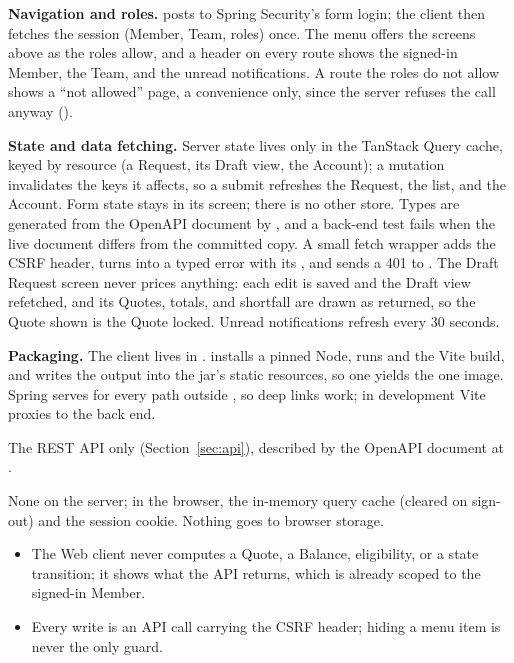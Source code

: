 \textbf{Navigation and roles.}  posts to Spring Security's form login; the client then fetches the session (Member, Team, roles) once. The menu offers the screens above as the roles allow, and a header on every route shows the signed-in Member, the Team, and the unread notifications. A route the roles do not allow shows a ``not allowed'' page, a convenience only, since the server refuses the call anyway ().

\textbf{State and data fetching.} Server state lives only in the TanStack Query cache, keyed by resource (a Request, its Draft view, the Account); a mutation invalidates the keys it affects, so a submit refreshes the Request, the list, and the Account. Form state stays in its screen; there is no other store. Types are generated from the OpenAPI document by , and a back-end test fails when the live document differs from the committed copy. A small fetch wrapper adds the CSRF header, turns  into a typed error with its , and sends a 401 to . The Draft Request screen never prices anything: each edit is saved and the Draft view refetched, and its Quotes, totals, and shortfall are drawn as returned, so the Quote shown is the Quote locked. Unread notifications refresh every 30 seconds.

\textbf{Packaging.} The client lives in .  installs a pinned Node, runs  and the Vite build, and writes the output into the jar's static resources, so one  yields the one image. Spring serves  for every path outside , so deep links work; in development Vite proxies  to the back end.

The REST API only (Section~\ref{sec:api}), described by the OpenAPI document at .

None on the server; in the browser, the in-memory query cache (cleared on sign-out) and the  session cookie. Nothing goes to browser storage.

\begin{itemize}
\item The Web client never computes a Quote, a Balance, eligibility, or a state transition; it shows what the API returns, which is already scoped to the signed-in Member.
\item Every write is an API call carrying the CSRF header; hiding a menu item is never the only guard.
\end{itemize}

